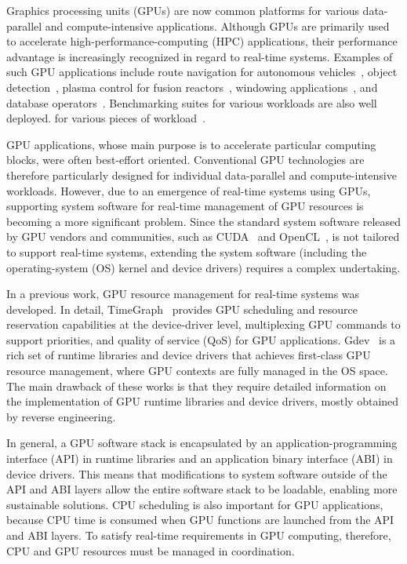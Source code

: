 Graphics processing units (GPUs) are now common platforms for various data-parallel and compute-intensive applications. Although GPUs are primarily used to accelerate high-performance-computing (HPC) applications, their performance advantage is increasingly recognized in regard to real-time systems. Examples of such GPU applications include route navigation for autonomous vehicles~\cite{cmu:routing}, object detection~\cite{hirabayashi:cpsna2013}, plasma control for fusion reactors~\cite{tokamak}, windowing applications~\cite{kato:rtas2011}, and database operators~\cite{bakkum:sql}. Benchmarking suites for various workloads are also well deployed. for various pieces of workload~\cite{rodinia}.

GPU applications, whose main purpose is to accelerate particular computing blocks, were often best-effort oriented. Conventional GPU technologies are therefore particularly designed for individual data-parallel and compute-intensive workloads. However, due to an emergence of real-time systems using GPUs, supporting system software for real-time management of GPU resources is becoming a more significant problem. Since the standard system software released by GPU vendors and communities, such as CUDA~\cite{nvidia:cuda_zone} and OpenCL~\cite{opencl}, is not tailored to support real-time systems, extending the system software (including the operating-system (OS) kernel and device drivers) requires a complex undertaking.

In a previous work, GPU resource management for real-time systems was developed. In detail, TimeGraph~\cite{kato:timegraph} provides GPU scheduling and resource reservation capabilities at the device-driver level, multiplexing GPU commands to support priorities, and quality of service (QoS) for GPU applications. Gdev~\cite{kato:gdev} is a rich set of runtime libraries and device drivers that achieves first-class GPU resource management, where GPU contexts are fully managed in the OS space. The main drawback of these works is that they require detailed information on the implementation of GPU runtime libraries and device drivers, mostly obtained by reverse engineering.

In general, a GPU software stack is encapsulated by an application-programming interface (API) in runtime libraries and an application binary interface (ABI) in device drivers. This means that modifications to system software outside of the API and ABI layers allow the entire software stack to be loadable, enabling more sustainable solutions. CPU scheduling is also important for GPU applications, because CPU time is consumed when GPU functions are launched from the API and ABI layers. To satisfy real-time requirements in GPU computing, therefore, CPU and GPU resources must be managed in coordination.

